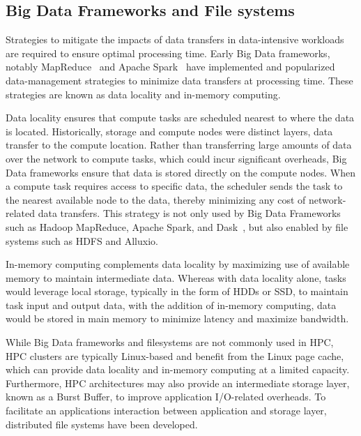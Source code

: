 \documentclass[10pt,journal,compsoc]{IEEEtran}
\begin{document}
\subsection{Big Data Frameworks and File systems}

      Strategies to mitigate the impacts of data transfers in data-intensive
      workloads are required to ensure optimal processing time. Early Big Data
      frameworks, notably MapReduce~\cite{dean2008mapreduce} and Apache
      Spark~\cite{zaharia2016apache} have implemented and popularized
      data-management strategies to minimize data transfers at processing time.
      These strategies are known as data locality and in-memory computing.

      Data locality ensures that compute tasks are scheduled nearest to where
      the data is located. Historically, storage and compute nodes were distinct
      layers, data transfer to the compute location. Rather than transferring
      large amounts of data over the network to compute tasks, which could incur
      significant overheads, Big Data frameworks ensure that data is stored
      directly on the compute nodes. When a compute task requires access to
      specific data, the scheduler sends the task to the nearest available node
      to the data, thereby minimizing any cost of network-related data
      transfers. This strategy is not only used by Big Data Frameworks such as
      Hadoop MapReduce, Apache Spark, and Dask~\cite{rocklin2015dask}, but also
      enabled by file systems such as HDFS and Alluxio.

      In-memory computing complements data locality by maximizing use of
      available memory to maintain intermediate data. Whereas with data locality
      alone, tasks would leverage local storage, typically in the form of HDDs
      or SSD, to maintain task input and output data, with the addition of
      in-memory computing, data would be stored in main memory to minimize
      latency and maximize bandwidth.

      While Big Data frameworks and filesystems are not commonly used in HPC,
      HPC clusters are typically Linux-based and benefit from the Linux page
      cache, which can provide data locality and in-memory computing at a
      limited capacity. Furthermore, HPC architectures may also provide an
      intermediate storage layer, known as a Burst Buffer, to improve
      application I/O-related overheads. To facilitate an applications
      interaction between application and storage layer, distributed file
      systems have been developed.
\end{document}

